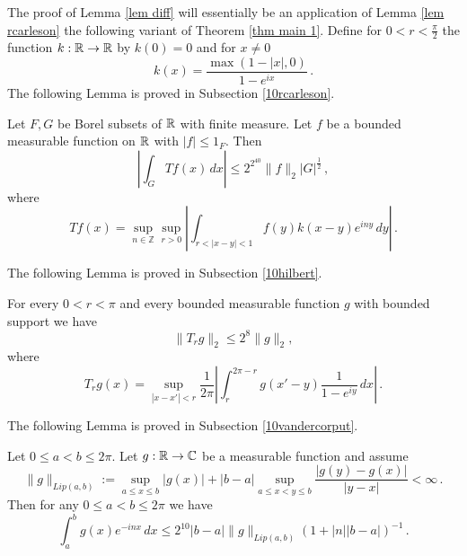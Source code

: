 The proof of Lemma \ref{lem diff} will essentially be
an application of Lemma \ref{lem rcarleson}
the following variant of Theorem \ref{thm main 1}.
Define for $0<r<\frac \pi2$ the function $k:\mathbb{R}\to \mathbb{R}$
by $k(0)=0$ and for $x\neq 0$
\begin{equation}\label{eq hilker}
k(x)=\frac {\max (1-|x|, 0)}{1-e^{ix}}\, .
\end{equation}
The following Lemma is proved in Subsection \ref{10rcarleson}.
\begin{lemma}\label{lem rcarleson}
    Let $F,G$ be Borel subsets of $\mathbb{R}$ with finite measure. Let $f$ be a bounded measurable function on $\mathbb{R}$ with $|f|\le 1_F$. Then
\begin{equation}
    |\int _G Tf(x) \, dx| \le 2^{2^{40}}\|f\|_2 |G|^{\frac 12} \, ,
\end{equation}
where
\begin{equation}
    T f(x)=\sup_{n\in \mathbb{Z}}
    \sup_{r>0}\left|\int_{r<|x-y|<1} f(y)k(x-y) e^{iny}\, dy\right|\, .
\end{equation}
\end{lemma}


The following Lemma is proved in Subsection \ref{10hilbert}.
\begin{lemma}\label{lem hilbert}
    For every $0<r<\pi$ and every  bounded measurable function $g$ with bounded support we have
\begin{equation}
    \|T_rg\|_2\le 2^8\|g\|_2,
\end{equation}
where
\begin{equation}
    T_r g(x)=\sup_{|x-x'|<r}\frac 1{2\pi} \left|\int_{r}^{2\pi -r}
g(x'-y) \frac 1{1-e^{iy}}\, dx\right|\, .
\end{equation}
\end{lemma}
The following Lemma is proved in Subsection \ref{10vandercorput}.
\begin{lemma}\label{lem vdc}
    Let $0\le a<b\le 2\pi$. Let $g:\mathbb{R}\to \mathbb{C}$ be a  measurable function and assume
    \begin{equation}
        \|g\|_{Lip(a,b)}:=\sup_{a\le x\le b}|g(x)|+|b-a|
        \sup_{a\le x<y\le b} \frac {|g(y)-g(x)|}{|y-x|}<\infty\, .
    \end{equation}
    Then for any $0\le a<b\le 2\pi$ we have
    \begin{equation}
        \int _{a}^{b} g(x) e^{-inx}\, dx\le 2^{10} |b-a|\|g\|_{Lip(a,b)}(1+|n||b-a|)^{-1}\, .
    \end{equation}

\end{lemma}







